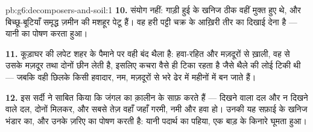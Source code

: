 \begin{solution}{pb:g6:decomposers-and-soil:1}
\textbf{10.} संयोग नहीं: गाड़ी हुई  के खनिज ठीक वहीं मुक्त हुए
थे, और बिच्छू-बूटियाँ समृद्ध ज़मीन की मशहूर पेटू हैं। वह हरी पट्टी चक्र
के आख़िरी तीर का दिखाई देना है --- यानी   का पोषण करता
हुआ।

\textbf{11.} कूड़ाघर की लपेट शहर के पैमाने पर वही बंद थैला है: हवा-रहित
और मज़दूरों से ख़ाली, वह  से उसके मज़दूर तथा  दोनों
छीन लेती है, इसलिए कचरा वैसे ही टिका रहता है जैसे थैले की लोई टिकी थी
--- जबकि वही छिलके किसी हवादार, नम, मज़दूरों से भरे ढेर में महीनों में
 बन जाते हैं।

\textbf{12.} इस सर्दी ने साबित किया कि जंगल का क़ालीन  के 
साफ़ करते हैं --- दिखने वाला दल और न दिखने वाले दल, दोनों मिलकर, और
सबसे तेज़ वहाँ जहाँ गरमी, नमी और हवा हो। उनकी यह सफ़ाई  के खनिज
भंडार का, और उनके ज़रिए  का पोषण करती है: यानी पदार्थ का पहिया,
एक बाड़ के किनारे घूमता हुआ।
\end{solution}
